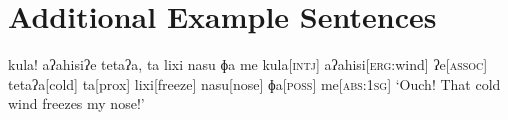 \chapter{Additional Example Sentences}

\ex
\begingl
\glpreamble kula! aʔahisiʔe tetaʔa, ta lixi nasu ɸa me\endpreamble
kula[\textsc{intj}]
aʔahisi[\textsc{erg:}wind]
ʔe[\textsc{assoc}]
tetaʔa[cold]
ta[prox]
lixi[freeze]
nasu[nose]
ɸa[\textsc{poss}]
me[\textsc{abs:1sg}]
\glft `Ouch! That cold wind freezes my nose!'
\endgl
\xe
